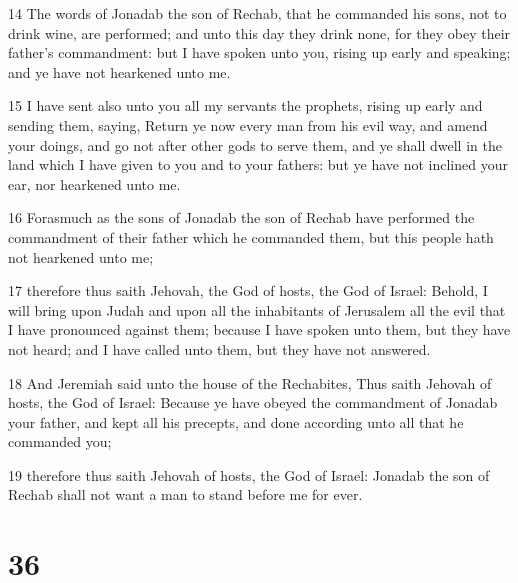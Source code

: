 \par 14 The words of Jonadab the son of Rechab, that he commanded his sons, not to drink wine, are performed; and unto this day they drink none, for they obey their father's commandment: but I have spoken unto you, rising up early and speaking; and ye have not hearkened unto me.
\par 15 I have sent also unto you all my servants the prophets, rising up early and sending them, saying, Return ye now every man from his evil way, and amend your doings, and go not after other gods to serve them, and ye shall dwell in the land which I have given to you and to your fathers: but ye have not inclined your ear, nor hearkened unto me.
\par 16 Forasmuch as the sons of Jonadab the son of Rechab have performed the commandment of their father which he commanded them, but this people hath not hearkened unto me;
\par 17 therefore thus saith Jehovah, the God of hosts, the God of Israel: Behold, I will bring upon Judah and upon all the inhabitants of Jerusalem all the evil that I have pronounced against them; because I have spoken unto them, but they have not heard; and I have called unto them, but they have not answered.
\par 18 And Jeremiah said unto the house of the Rechabites, Thus saith Jehovah of hosts, the God of Israel: Because ye have obeyed the commandment of Jonadab your father, and kept all his precepts, and done according unto all that he commanded you;
\par 19 therefore thus saith Jehovah of hosts, the God of Israel: Jonadab the son of Rechab shall not want a man to stand before me for ever.

\chapter{36}

